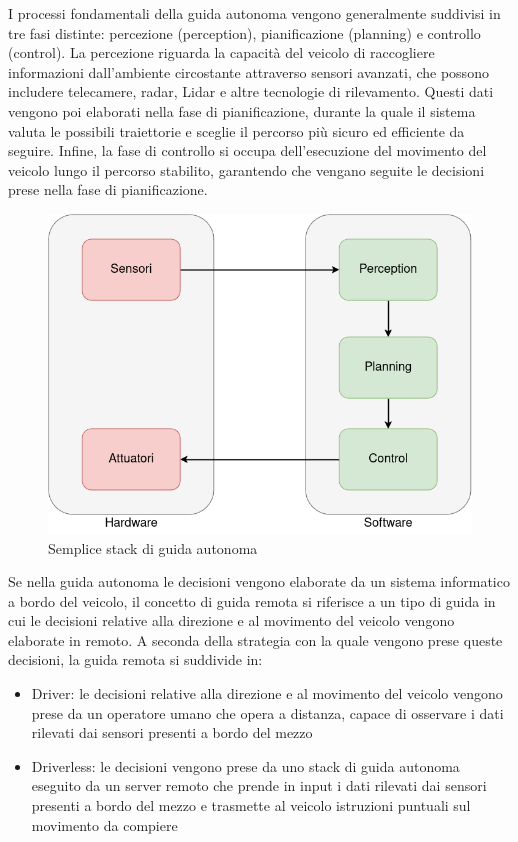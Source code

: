 \noindent I processi fondamentali della guida autonoma vengono generalmente suddivisi in tre fasi distinte: percezione (perception), pianificazione (planning) e controllo (control).
La percezione riguarda la capacità del veicolo di raccogliere informazioni dall'ambiente circostante attraverso sensori avanzati, che possono includere telecamere, radar, Lidar e altre tecnologie di rilevamento. Questi dati vengono poi elaborati nella fase di pianificazione, durante la quale il sistema valuta le possibili traiettorie e sceglie il percorso più sicuro ed efficiente da seguire. Infine, la fase di controllo si occupa dell'esecuzione del movimento del veicolo lungo il percorso stabilito, garantendo che vengano seguite le decisioni prese nella fase di pianificazione.

\begin{figure}[H]
  \centering
  \includegraphics[width=1\textwidth]{figures/guida_autonoma.png}
  \caption{Semplice stack di guida autonoma}
  \label{guida_autonoma}
\end{figure}

\noindent Se nella guida autonoma le decisioni vengono elaborate da un sistema informatico a bordo del veicolo, il concetto di guida remota si riferisce a un tipo di guida in cui le decisioni relative alla direzione e al movimento del veicolo vengono elaborate in remoto. A seconda della strategia con la quale vengono prese queste decisioni, la guida remota si suddivide in:

\begin{itemize}
    \item Driver: le decisioni relative alla direzione e al movimento del veicolo vengono prese da un operatore umano che opera a distanza, capace di osservare i dati rilevati dai sensori presenti a bordo del mezzo
    \item Driverless: le decisioni vengono prese da uno stack di guida autonoma eseguito da un server remoto che prende in input i dati rilevati dai sensori presenti a bordo del mezzo e trasmette al veicolo istruzioni puntuali sul movimento da compiere 
\end{itemize}


